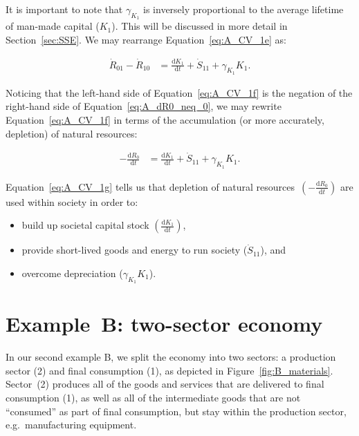 It is important to note that $\gamma_{K_{1}}$ 
is inversely proportional to the average lifetime
of man-made capital ($K_{1}$).
This will be discussed in more detail in
Section~\ref{sec:SSE}.
We may rearrange Equation~\ref{eq:A_CV_1e} as:

 \begin{align}\label{eq:A_CV_1f}
	\dot{R}_{01} 
	- \dot{R}_{10}												&
	= 	\frac{\mathrm{d}K_{1}}{\mathrm{d}t}
	+ \dot{S}_{11}
	+ \gamma_{K_{1}}{K}_{1}.
\end{align}

Noticing that the left-hand side
of Equation~\ref{eq:A_CV_1f} is the negation 
of the right-hand side of Equation~\ref{eq:A_dR0_neq_0},
we may rewrite Equation~\ref{eq:A_CV_1f}
in terms of the accumulation 
(or more accurately, depletion)
of natural resources: 

 \begin{align}\label{eq:A_CV_1g}
	- 	\frac{\mathrm{d}R_{0}}{\mathrm{d}t}	&
	= 	\frac{\mathrm{d}K_{1}}{\mathrm{d}t}
	+ \dot{S}_{11}
	+ \gamma_{K_{1}}{K}_{1}.
\end{align}

Equation~\ref{eq:A_CV_1g} tells us that depletion of
natural resources~$\left(-\frac{\mathrm{d}R_{0}}{\mathrm{d}t}\right)$
are used within society in order to:

\begin{itemize}
	\item build up societal capital stock 
	$\left(\frac{\mathrm{d}K_{1}}{\mathrm{d}t}\right)$,
	\item provide short-lived goods and energy to 
	run society ($\dot{S}_{11}$), and
	\item overcome depreciation
	($\gamma_{K_{1}}{K}_{1}$).
\end{itemize}




\section{Example~B: two-sector economy} %
\label{sec:B_materials}

In our second example B, we split the economy into two sectors: 
a production sector (2) and final consumption (1), 
as depicted in Figure~\ref{fig:B_materials}. 
Sector~(2) produces all of the goods and services 
that are delivered to final consumption (1), 
as well as all of the intermediate goods that are not ``consumed'' 
as part of final consumption, but stay within the production sector, e.g.\ manufacturing equipment.

